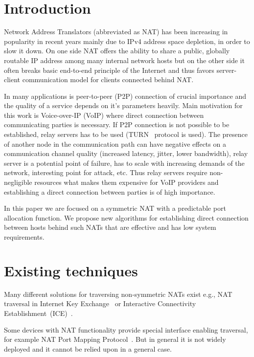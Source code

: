 \documentclass[twoside]{article}
\newcommand{\ignore}[1]{}
\begin{document}
\begin{multicols}{2}

\section{Introduction}
Network Address Translators (abbreviated as NAT) has been increasing in popularity in recent years 
mainly due to IPv4 address space depletion, in order to slow it down. On one side NAT offers
the ability to share a public, globally routable IP address among many internal network hosts but on 
the other side it often breaks basic end-to-end principle of the Internet and thus favors server-client 
communication model for clients connected behind NAT.

In many applications is peer-to-peer (P2P) connection of crucial importance and the quality of a service depends on 
it's parameters heavily. Main motivation for this work is Voice-over-IP (VoIP) where direct connection 
between communicating parties is necessary. If P2P connection is not possible to be established, relay 
servers has to be used (TURN~\citep{rfc5766} protocol is used). The presence 
of another node in the communication path can have negative effects on a communication channel quality 
(increased latency, jitter, lower bandwidth), relay server is a potential point of failure, 
has to scale with increasing demands of the network, interesting point for attack, etc.
Thus relay servers require non-negligible resources what makes them expensive for VoIP providers and
establishing a direct connection between parties is of high importance.

In this paper we are focused on a symmetric NAT with a predictable port allocation function. We propose 
new algorithms for establishing direct connection between hosts behind such NATs that are effective and 
has low system requirements.

\section{Existing techniques}
Many different solutions for traversing non-symmetric NATs exist e.g., NAT traversal in Internet Key Exchange~\citep{rfc3947} or 
Interactive Connectivity Establishment~(ICE)~\citep{rfc5245}. %

Some devices with NAT functionality provide special interface enabling traversal, for example NAT Port Mapping Protocol~\citep{rfc6886}. But in general 
it is not widely deployed and it cannot be relied upon in a general case. 


\end{multicols}
\end{document}
